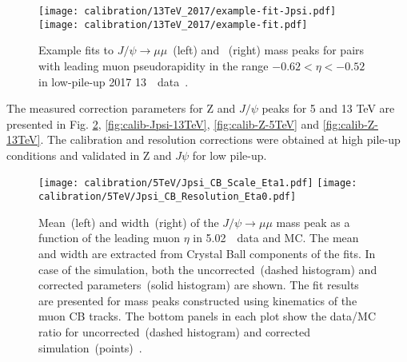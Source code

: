 	\begin{figure}[htb!]
		\begin{center}
			\texttt{[image: calibration/13TeV\_2017/example-fit-Jpsi.pdf]}
			\texttt{[image: calibration/13TeV\_2017/example-fit.pdf]}
			\caption{Example fits to $J/\psi \to \mu\mu$~(left) and \Zmm~(right) mass peaks for pairs with leading muon pseudorapidity in the range $-0.62<\eta<-0.52$ in low-pile-up 2017 13~\TeV\ data~\cite{int_note_muons}.}
			\label{fig:calib-fits}
		\end{center}
	\end{figure}

	The measured correction parameters for Z and $J/\psi$ peaks for 5 and 13 TeV are presented in Fig. \ref{fig:calib-Jpsi-5TeV}, \ref{fig:calib-Jpsi-13TeV}, \ref{fig:calib-Z-5TeV} and \ref{fig:calib-Z-13TeV}. The calibration and resolution corrections were obtained at high pile-up conditions and validated in Z and $J\psi$ for low pile-up.
	
	\begin{figure}[htb!]
		\begin{center}
			\texttt{[image: calibration/5TeV/Jpsi\_CB\_Scale\_Eta1.pdf]}
			\texttt{[image: calibration/5TeV/Jpsi\_CB\_Resolution\_Eta0.pdf]}
			\caption{Mean~(left) and width~(right) of the $J/\psi \to \mu\mu$ mass peak as a function of the leading muon $\eta$ in 5.02~\TeV\ data and MC. The mean and width are extracted from Crystal Ball components of the fits. In case of the simulation, both the uncorrected~(dashed histogram) and corrected parameters~(solid histogram) are shown. The fit results are presented for mass peaks constructed using kinematics of the muon CB tracks. The bottom panels in each plot show the data/MC ratio for uncorrected~(dashed histogram) and corrected simulation~(points)~\cite{int_note_muons}.}
			\label{fig:calib-Jpsi-5TeV}
		\end{center}
	\end{figure}
	
